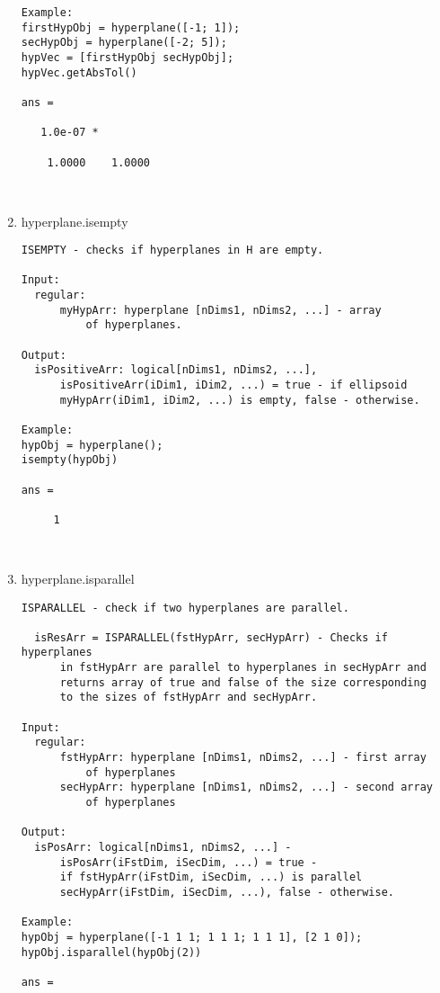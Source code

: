 \begin{enumerate}
\begin{lstlisting}
Example:
firstHypObj = hyperplane([-1; 1]);
secHypObj = hyperplane([-2; 5]);
hypVec = [firstHypObj secHypObj];
hypVec.getAbsTol()

ans =

   1.0e-07 *

    1.0000    1.0000



\end{lstlisting}
\fontfamily{\familydefault}
\selectfont
\item {hyperplane.isempty}
\selectfont
\begin{lstlisting}
ISEMPTY - checks if hyperplanes in H are empty.

Input:
  regular:
      myHypArr: hyperplane [nDims1, nDims2, ...] - array
          of hyperplanes.

Output:
  isPositiveArr: logical[nDims1, nDims2, ...],
      isPositiveArr(iDim1, iDim2, ...) = true - if ellipsoid
      myHypArr(iDim1, iDim2, ...) is empty, false - otherwise.

Example:
hypObj = hyperplane();
isempty(hypObj)

ans =

     1



\end{lstlisting}
\fontfamily{\familydefault}
\selectfont
\item {hyperplane.isparallel}
\selectfont
\begin{lstlisting}
ISPARALLEL - check if two hyperplanes are parallel.

  isResArr = ISPARALLEL(fstHypArr, secHypArr) - Checks if hyperplanes
      in fstHypArr are parallel to hyperplanes in secHypArr and
      returns array of true and false of the size corresponding
      to the sizes of fstHypArr and secHypArr.

Input:
  regular:
      fstHypArr: hyperplane [nDims1, nDims2, ...] - first array
          of hyperplanes
      secHypArr: hyperplane [nDims1, nDims2, ...] - second array
          of hyperplanes

Output:
  isPosArr: logical[nDims1, nDims2, ...] -
      isPosArr(iFstDim, iSecDim, ...) = true -
      if fstHypArr(iFstDim, iSecDim, ...) is parallel
      secHypArr(iFstDim, iSecDim, ...), false - otherwise.

Example:
hypObj = hyperplane([-1 1 1; 1 1 1; 1 1 1], [2 1 0]);
hypObj.isparallel(hypObj(2))

ans =


\end{lstlisting}
\end{enumerate}
